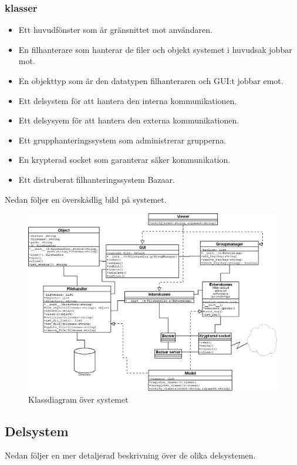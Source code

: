 \subsubsection{klasser}
\begin{itemize}
\item Ett huvudfönster som är gränsnittet mot användaren.
\item En filhanterare som hanterar de filer och objekt systemet i huvudsak jobbar mot.
\item En objekttyp som är den datatypen filhanteraren och GUI:t jobbar emot.
\item Ett delsystem för att hantera den interna kommunikationen.
\item Ett delsysyem för att hantera den externa kommunikationen. 
\item Ett grupphanteringssystem som administrerar grupperna.
\item En krypterad socket som garanterar säker kommunikation.
\item Ett distruberat filhanteringssystem Bazaar.
\end{itemize}
Nedan följer en överskådlig bild på systemet.
 
\begin{figure}[ht]
  \includegraphics[width=160mm]{klassdiagram.png}
  \caption{Klassdiagram över systemet}
  \label{fig1}
\end{figure}
\clearpage
\subsection{Delsystem}
Nedan följer en mer detaljerad beskrivning över de olika delsystemen.


